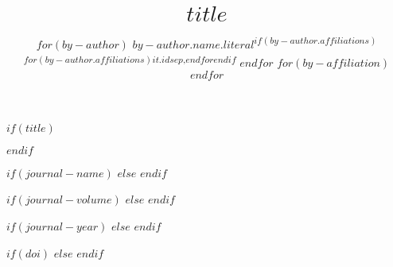 
$if(title)$
\title{$title$}
$endif$

\author{
$for(by-author)$
$by-author.name.literal$\textsuperscript{$if(by-author.affiliations)$$for(by-author.affiliations)$$it.id$$sep$,$endfor$$endif$}
$endfor$
$for(by-affiliation)$
$endfor$
}

$if(journal-name)$
$else$
$endif$

$if(journal-volume)$
$else$
$endif$

$if(journal-year)$
$else$
$endif$

$if(doi)$
$else$
$endif$
